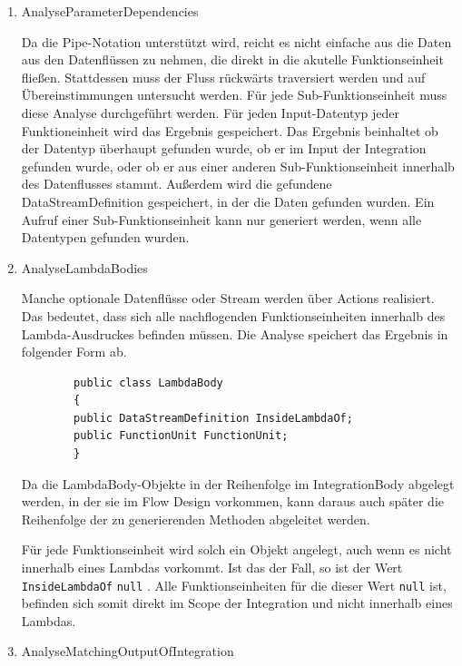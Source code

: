 	\begin{enumerate}
		\item AnalyseParameterDependencies

		Da die Pipe-Notation unterstützt wird, reicht es nicht einfache aus die Daten
		aus den Datenflüssen zu nehmen, die direkt in die akutelle
		Funktionseinheit fließen. Stattdessen muss der Fluss rückwärts
		traversiert werden und auf Übereinstimmungen untersucht werden.
		Für jede Sub-Funktionseinheit muss diese Analyse durchgeführt werden.
		Für jeden Input-Datentyp jeder Funktioneinheit wird das Ergebnis gespeichert. Das Ergebnis beinhaltet ob der Datentyp überhaupt gefunden
		wurde, ob er im Input der Integration gefunden wurde, oder ob er aus einer
		anderen Sub-Funktionseinheit innerhalb des Datenflusses stammt. 
		Außerdem wird die gefundene DataStreamDefinition gespeichert, in der die
		Daten gefunden wurden. Ein Aufruf einer Sub-Funktionseinheit kann nur generiert werden, wenn alle Datentypen gefunden
		wurden.
		
		\item AnalyseLambdaBodies

		Manche optionale Datenflüsse oder Stream werden über Actions realisiert.
		Das bedeutet, dass sich alle nachflogenden Funktionseinheiten innerhalb
		des Lambda-Ausdruckes befinden müssen. Die Analyse speichert das Ergebnis
		in folgender Form ab. 
		
		\begin{verbatim}
		public class LambdaBody
		{
		public DataStreamDefinition InsideLambdaOf;
		public FunctionUnit FunctionUnit;
		}
		\end{verbatim}
		
		Da die LambdaBody-Objekte in der Reihenfolge im IntegrationBody abgelegt
		werden, in der sie im Flow Design vorkommen, kann daraus auch später die
		Reihenfolge der zu generierenden Methoden abgeleitet werden.
		
		
		Für jede Funktionseinheit wird solch ein Objekt angelegt, auch wenn es
		nicht innerhalb eines Lambdas vorkommt. Ist das der Fall, so ist der Wert
		\texttt{InsideLambdaOf} \texttt{null} . Alle Funktionseinheiten für die dieser Wert
		\texttt{null} ist, befinden sich somit direkt im Scope der Integration und nicht
		innerhalb eines Lambdas.
		
		\item AnalyseMatchingOutputOfIntegration


\end{enumerate}
